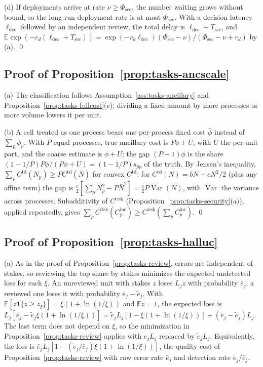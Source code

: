 (d) If deployments arrive at rate $\nu\ge\Phi_{\mathrm{sec}}$, the number waiting grows without bound, so the long-run deployment rate is at most $\Phi_{\mathrm{sec}}$. With a decision latency $\ell_{\mathrm{dec}}$ followed by an independent review, the total delay is $\ell_{\mathrm{dec}}+T_{\mathrm{sec}}$, and $\mathbb E\exp(-r_d(\ell_{\mathrm{dec}}+T_{\mathrm{sec}}))=\exp(-r_d\ell_{\mathrm{dec}})(\Phi_{\mathrm{sec}}-\nu)/(\Phi_{\mathrm{sec}}-\nu+r_d)$ by (a). \qed

\subsection*{Proof of Proposition~\ref{prop:tasks-ancscale}}

(a) The classification follows Assumption~\ref{ass:tasks-ancillary} and Proposition~\ref{prop:tasks-fullcost}(c); dividing a fixed amount by more processes or more volume lowers it per unit.

(b) A cell treated as one process bears one per-process fixed cost $\bar\phi$ instead of $\sum_p\phi_p$. With $P$ equal processes, true ancillary cost is $P\phi+U$, with $U$ the per-unit part, and the coarse estimate is $\phi+U$; the gap $(P-1)\phi$ is the share $(1-1/P)P\phi/(P\phi+U)=(1-1/P)s_{pp}$ of the truth. By Jensen's inequality, $\sum_pC^{\mathrm{td}}(N_p)\ge PC^{\mathrm{td}}(\bar N)$ for convex $C^{\mathrm{td}}$; for $C^{\mathrm{td}}(N)=bN+cN^2/2$ (plus any affine term) the gap is $\frac c2[\sum_pN_p^2-P\bar N^2]=\frac c2P\operatorname{Var}(N)$, with $\operatorname{Var}$ the variance across processes. Subadditivity of $C^{\mathrm{risk}}$ (Proposition~\ref{prop:tasks-security}(a)), applied repeatedly, gives $\sum_pC^{\mathrm{risk}}(C^{\mathrm{inc}}_p)\ge C^{\mathrm{risk}}(\sum_pC^{\mathrm{inc}}_p)$. \qed

\subsection*{Proof of Proposition~\ref{prop:tasks-halluc}}

(a) As in the proof of Proposition~\ref{prop:tasks-review}, errors are independent of stakes, so reviewing the top share by stakes minimizes the expected undetected loss for each $\xi$. An unreviewed unit with stakes $z$ loses $L_jz$ with probability $\bar e_j$; a reviewed one loses it with probability $\bar e_j-\tilde e_j$. With $\mathbb E[z\mathbf 1\{z\ge z_\xi\}]=\xi(1+\ln(1/\xi))$ and $\mathbb Ez=1$, the expected loss is $L_j[\bar e_j-\tilde e_j\xi(1+\ln(1/\xi))]=\tilde e_jL_j[1-\xi(1+\ln(1/\xi))]+(\bar e_j-\tilde e_j)L_j$. The last term does not depend on $\xi$, so the minimization in Proposition~\ref{prop:tasks-review} applies with $e_jL_j$ replaced by $\tilde e_jL_j$. Equivalently, the loss is $\bar e_jL_j[1-(\tilde e_j/\bar e_j)\xi(1+\ln(1/\xi))]$, the quality cost of Proposition~\ref{prop:tasks-review} with raw error rate $\bar e_j$ and detection rate $\tilde e_j/\bar e_j$.

